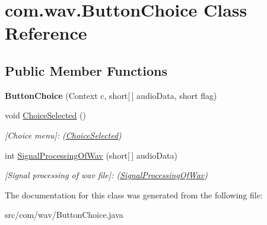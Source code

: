 \hypertarget{classcom_1_1wav_1_1_button_choice}{}\section{com.\+wav.\+Button\+Choice Class Reference}
\label{classcom_1_1wav_1_1_button_choice}
\subsection*{Public Member Functions}
\begin{DoxyCompactItemize}
\item 
\hypertarget{classcom_1_1wav_1_1_button_choice_a309b096f77832d59d464c9b21cf734a0}{}{\bfseries Button\+Choice} (Context c, short\mbox{[}$\,$\mbox{]} audio\+Data, short flag)\label{classcom_1_1wav_1_1_button_choice_a309b096f77832d59d464c9b21cf734a0}

\item 
\hypertarget{classcom_1_1wav_1_1_button_choice_a7cf9368011280b6176bf2cd91c033fb9}{}void \hyperlink{classcom_1_1wav_1_1_button_choice_a7cf9368011280b6176bf2cd91c033fb9}{Choice\+Selected} ()\label{classcom_1_1wav_1_1_button_choice_a7cf9368011280b6176bf2cd91c033fb9}

\begin{DoxyCompactList}\small\item\em \mbox{[}Choice menu\mbox{]}\+: (\hyperlink{classcom_1_1wav_1_1_button_choice_a7cf9368011280b6176bf2cd91c033fb9}{Choice\+Selected}) \end{DoxyCompactList}\item 
\hypertarget{classcom_1_1wav_1_1_button_choice_ae479a1477af17c3bbf195b1fde7a597b}{}int \hyperlink{classcom_1_1wav_1_1_button_choice_ae479a1477af17c3bbf195b1fde7a597b}{Signal\+Processing\+Of\+Wav} (short\mbox{[}$\,$\mbox{]} audio\+Data)\label{classcom_1_1wav_1_1_button_choice_ae479a1477af17c3bbf195b1fde7a597b}

\begin{DoxyCompactList}\small\item\em \mbox{[}Signal processing of wav file\mbox{]}\+: (\hyperlink{classcom_1_1wav_1_1_button_choice_ae479a1477af17c3bbf195b1fde7a597b}{Signal\+Processing\+Of\+Wav}) \end{DoxyCompactList}\end{DoxyCompactItemize}


The documentation for this class was generated from the following file\+:\begin{DoxyCompactItemize}
\item 
src/com/wav/Button\+Choice.\+java\end{DoxyCompactItemize}
